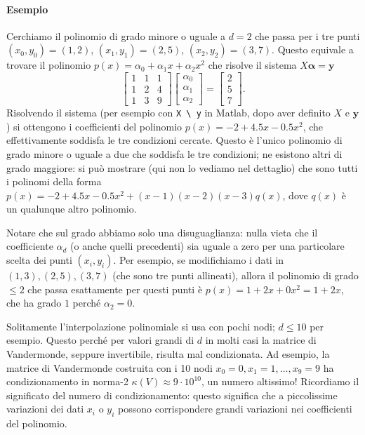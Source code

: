 \documentclass[a4paper]{report}
\theoremstyle{definition}
\theoremstyle{remark}
\begin{document}
\paragraph{Esempio} Cerchiamo il polinomio di grado minore o uguale a $d=2$ che passa per i tre punti $(x_0,y_0) = (1,2)$, $(x_1,y_1) = (2,5)$, $(x_2,y_2) = (3,7)$. Questo equivale a trovare il polinomio $p(x) = \alpha_0 + \alpha_1 x + \alpha_2 x^2$ che risolve il sistema $X\mathbf{\alpha} = \mathbf{y}$
\[
    \begin{bmatrix}
    1 & 1 & 1\\
    1 & 2 & 4\\
    1 & 3 & 9
    \end{bmatrix}\begin{bmatrix}
        \alpha_0\\
        \alpha_1\\
        \alpha_2
    \end{bmatrix} = \begin{bmatrix}
        2\\5\\7
    \end{bmatrix}.
\]
Risolvendo il sistema (per esempio con \lstinline{X \ y} in Matlab, dopo aver definito $X$ e $\mathbf{y}$) si ottengono i coefficienti del polinomio $p(x) = -2 + 4.5 x - 0.5x^2$, che effettivamente soddisfa le tre condizioni cercate. Questo è l'unico polinomio di grado minore o uguale a due che soddisfa le tre condizioni; ne esistono altri di grado maggiore: si può mostrare (qui non lo vediamo nel dettaglio) che sono tutti i polinomi della forma $p(x) = -2 + 4.5 x - 0.5x^2 + (x-1)(x-2)(x-3)q(x)$, dove $q(x)$ è un qualunque altro polinomio.

Notare che sul grado abbiamo solo una disuguaglianza: nulla vieta che il coefficiente $\alpha_d$ (o anche quelli precedenti) sia uguale a zero per una particolare scelta dei punti $(x_i,y_i)$. Per esempio, se modifichiamo i dati in $(1,3), (2,5), (3,7)$ (che sono tre punti allineati), allora il polinomio di grado $\leq 2$ che passa esattamente per questi punti è $p(x)=1+2x+0x^2 = 1+2x$, che ha grado $1$ perché $\alpha_2 = 0$. 

Solitamente l'interpolazione polinomiale si usa con pochi nodi; $d \leq 10$ per esempio. Questo perché per valori grandi di $d$ in molti casi la matrice di Vandermonde, seppure invertibile, risulta mal condizionata. Ad esempio, la matrice di Vandermonde costruita con i 10 nodi $x_0 = 0,x_1=1,\dots,x_9=9$ ha condizionamento in norma-2 $\kappa(V) \approx 9\cdot 10^{10}$, un numero altissimo! Ricordiamo il significato del numero di condizionamento: questo significa che a piccolissime variazioni dei dati $x_i$ o $y_i$ possono corrispondere grandi variazioni nei coefficienti del polinomio. 
\end{document}
